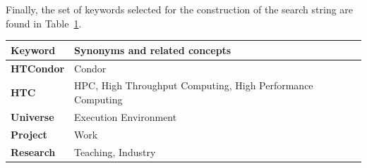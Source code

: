 Finally, the set of keywords selected for the construction of the search string are found in Table~\ref{table:database_search_keywords}.


\begin{table}
	{\begin{tabular}{p{2.0cm}p{7.0cm}} \toprule
			\textbf{Keyword}  & \textbf{Synonyms and related concepts}                     \\[0.5em]
			\midrule
			\textbf{HTCondor} & Condor                                                     \\[0.5em]
			\textbf{HTC}      & HPC, High Throughput Computing, High Performance Computing \\[0.5em]
			\textbf{Universe} & Execution Environment                                      \\[0.5em]
			\textbf{Project}  & Work                                                       \\[0.5em]
			\textbf{Research} & Teaching, Industry                                         \\[0.5em]
			\bottomrule
		\end{tabular}}
	\label{table:database_search_keywords}
\end{table}





